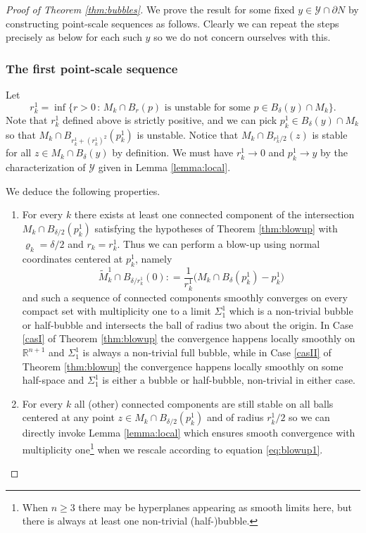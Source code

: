\documentclass[10pt]{amsart}
\let\mathcal\mathscr
\newenvironment{enumeratea}
{\bgroup\def\theenumi{\alph{enumi}}\begin{enumerate}}
{\end{enumerate}\egroup}
\newcounter{cas}
\newcommand{\sep}{\,:\,}
\theoremstyle{definition}
\newcommand{\R}{\mathbb{R}}
\begin{document}
\begin{proof}[Proof of Theorem \ref{thm:bubbles}]
We prove the result for some fixed $y\in\mathcal{Y}\cap \partial N$ by constructing point-scale sequences as follows. Clearly we can repeat the steps precisely as below for each such $y$ so we do not concern ourselves with this.

\subsubsection*{The first point-scale sequence} Let
\begin{equation*}
r^1_k = \inf \big\{r>0 \sep M_k\cap B_r(p) \text{ is unstable for some } p\in B_\delta(y)\cap M_k \big\}.
\end{equation*}
Note that $r^1_k$ defined above is strictly positive, and we can pick $p^1_k\in B_\delta(y)\cap M_k$ so that $M_k\cap B_{r^1_k+(r^1_k)^2}(p^1_k)$ is unstable. Notice that $M_k\cap B_{r^1_k/2}(z)$ is stable for all $z\in M_k\cap B_\delta (y)$ by definition.
We must have $r^1_k\to 0$ and $p^1_k\to y$ by the characterization of $\mathcal{Y}$ given in Lemma \ref{lemma:local}.

We deduce the following properties.
\begin{enumeratea}
\item
For every $k$ there exists at least one connected component of the intersection $M_k\cap B_{\delta/2}(p^1_k)$ satisfying the hypotheses of Theorem \ref{thm:blowup} with $\varrho_k = \delta/2$ and $r_k=r^1_k$. Thus we can perform a blow-up using normal coordinates centered at $p^1_k$, namely
\begin{equation}\label{eq:blowup1}
\widetilde{M}^1_k \cap B_{\delta/r^1_k}(0) : = \frac{1}{r^1_k} \big(M_k\cap B_\delta(p^1_k)- p^1_k\big)
\end{equation}
and such a sequence of connected components
smoothly converges on every compact set with multiplicity one to a limit $\Sigma^1_1$ which is a non-trivial bubble or half-bubble and intersects the ball of radius two about the origin. In Case \ref{casI} of Theorem \ref{thm:blowup} the convergence happens locally smoothly on $\R^{n+1}$ and $\Sigma^1_1$ is always a non-trivial full bubble, while in Case \ref{casII} of Theorem \ref{thm:blowup} the convergence happens locally smoothly on some half-space and $\Sigma^1_1$ is either a bubble or half-bubble, non-trivial in either case.

\item
For every $k$ all (other) connected components are still stable on all balls centered at any point $z\in M_k\cap B_{\delta/2}(p^1_k)$ and of radius $r^1_k/2$ so we can directly invoke Lemma \ref{lemma:local} which ensures smooth convergence with multiplicity one\footnote{When $n\geq 3$ there may be hyperplanes appearing as smooth limits here, but there is always at least one non-trivial (half-)bubble.} when we rescale according to equation \eqref{eq:blowup1}.
\end{enumeratea}


\end{proof}
\end{document}
